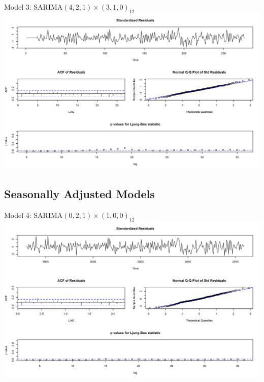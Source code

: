 \documentclass{beamer}
\begin{document}
  \begin{frame}{Model 3: SARIMA\((4, 2, 1) \times (3,1,0)_{12}\)}
  		\includegraphics[width=\linewidth]{images/seasonalmodel3}
  \end{frame}  

  \subsection{Seasonally Adjusted Models}
  \begin{frame}{Model 4: SARIMA\((0,2,1) \times (1,0,0)_{12}\)}
  	\includegraphics[width=\linewidth]{images/seasonallyadjustedmodel4}
  \end{frame}
  
  
\end{document}
